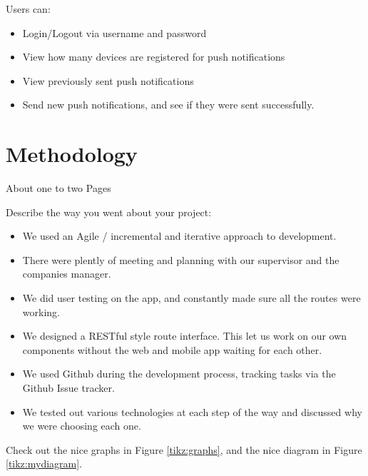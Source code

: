 Users can:
\begin{itemize}
\item Login/Logout via username and password
\item View how many devices are registered for push notifications
\item View previously sent push notifications
\item Send new push notifications, and see if they were sent successfully.
\end{itemize}


\chapter{Methodology}	%
About one to two Pages

Describe the way you went about your project:
\begin{itemize}
\item We used an Agile / incremental and iterative approach to development. 
\item There were plently of meeting and planning with our supervisor and the companies manager.
\item We did user testing on the app, and constantly made sure all the routes were working.
\item We designed a RESTful style route interface. This let us work on our own components without the web and mobile app waiting for each other.
\item We used Github during the development process, tracking tasks via the Github Issue tracker.
\item We tested out various technologies at each step of the way and discussed why we were choosing each one.
\end{itemize}

Check out the nice graphs in Figure \ref{tikz:graphs}, and the nice diagram in Figure \ref{tikz:mydiagram}.


